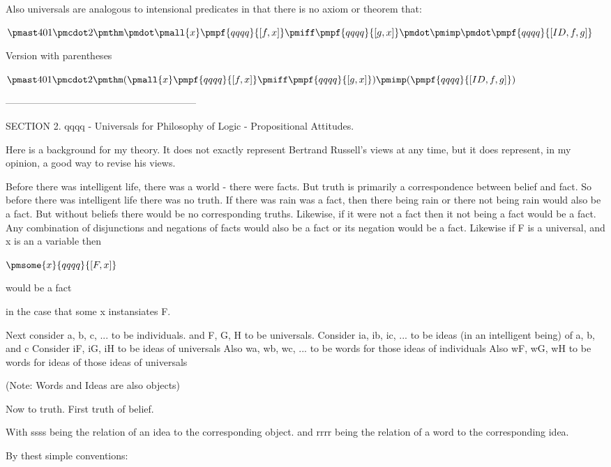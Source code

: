 \documentclass[12pt]{article}
\begin{document}
Also universals are analogous to intensional predicates in that there is no axiom or theorem that:

$\pmast 401 \pmcdot 2 \pmthm \pmdot \pmall{x} \pmpf{qqqq}{[f, x]} \pmiff \pmpf{qqqq}{[g, x]} \pmdot \pmimp \pmdot \pmpf{qqqq}{[ID, f, g]} $
 
 

Version with parentheses

$\pmast 401 \pmcdot 2 \pmthm  (  \pmall{x}\pmpf{qqqq}{[f, x]} \pmiff \pmpf{qqqq}{[g, x]}  ) \pmimp (  \pmpf{qqqq}{[ID, f, g]} )$


-----------------------------------------------------------

SECTION 2. qqqq - Universals for Philosophy of Logic - Propositional Attitudes.

Here is a background for my theory. It does not exactly
represent Bertrand Russell's views at any time, but it
does represent, in my opinion, a good way to revise
his views.

Before there was intelligent life, there was a world - there were facts.
But truth is primarily a correspondence between belief and fact.
So before there was intelligent life there was no truth.
If there was rain was a fact, then there being rain or there not
being rain would also be a fact. But without beliefs there would be
no corresponding truths.
Likewise, if it were not a fact then it not being a fact would be a fact.
Any combination of disjunctions and negations of facts would also
be a fact or its negation would be a fact.
Likewise if F is a universal, and x is an a variable then

$\pmsome{x}{qqqq}{[F,x]}$

would be a fact

in the case that some x instansiates F.

Next consider a, b, c, ... to be individuals.
and F, G, H to be universals. 
Consider ia, ib, ic, ... to be ideas (in an intelligent being) of a, b, and c
Consider iF, iG, iH to be ideas of universals
Also wa, wb, wc, ... to be words for those ideas of individuals
Also wF, wG, wH to be words for ideas of those ideas of universals

(Note: Words and Ideas are also objects)

Now to truth. First truth of belief.

With ssss being the relation of an idea to the corresponding object.
and rrrr being the relation of a word to the corresponding idea.

By thest simple conventions:
\end{document}
